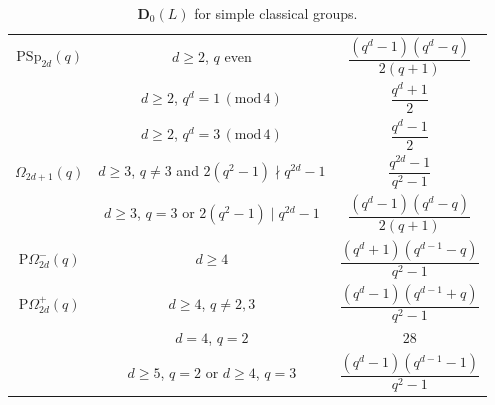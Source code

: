\documentclass{daj}
\theoremstyle{definition}
\theoremstyle{remark}
\newcommand{\D}{\mathbf{D}}
\begin{document}
{\begin{table}[ht]
\begin{tabular}{| c c | c |}
		\phantom{$\dfrac{1^1}{1_{1_1}}$}\hspace{-6mm}
		$\mathrm{PSp}_{2d}(q)$ & $d\geq 2$, $q$ even & $\dfrac{(q^d-1)(q^d-q)}{2(q+1)}$ \\
		
		\phantom{$\dfrac{1^1}{1_{1_1}}$}\hspace{-6mm}
		& $d\geq 2$, $q^d= 1\, (\mathrm{mod}\,4) $ & $\dfrac{q^d+1}{2}$ \\
		
		\phantom{$\dfrac{1^1}{1_{1_1}}$}\hspace{-6mm}
		& $d\geq 2$, $q^d= 3\, (\mathrm{mod}\,4) $ & $\dfrac{q^d-1}{2}$ \\
		
		\phantom{$\dfrac{1^1}{1_{1_1}}$}\hspace{-6mm}
		$\Omega_{2d+1}(q)$& $d\geq 3$, $q\ne 3$ and $2(q^2-1) \nmid q^{2d}-1$ & $\dfrac{q^{2d}-1}{q^2-1}$ \\
		
		\phantom{$\dfrac{1^1}{1_{1_1}}$}\hspace{-6mm}
		& $d\geq 3$, $q= 3$ or $2(q^2-1) \mid q^{2d}-1$ & $\dfrac{(q^{d}-1)(q^d-q)}{2(q+1)}$ \\
		
		\phantom{$\dfrac{1^1}{1_{1_1}}$}\hspace{-6mm}
		$\mathrm{P}\Omega^{-}_{2d}(q)$& $d\geq 4$ & $\dfrac{(q^d+1)(q^{d-1}-q)}{q^2-1}$ \\
		
		\phantom{$\dfrac{1^1}{1_{1_1}}$}\hspace{-6mm}
		$\mathrm{P}\Omega^{+}_{2d}(q)$& $d\geq 4$, $q\ne 2,3$ & $\dfrac{(q^d-1)(q^{d-1}+q)}{q^2-1}$ \\
		
		\phantom{$\dfrac{1^1}{1_{1_1}}$}\hspace{-6mm}
		& $d = 4$, $q= 2$ & $28$ \\
		
		\phantom{$\dfrac{1^1}{1_{1_1}}$}\hspace{-6mm}
		& $d \geq 5$, $q= 2$ or $d \geq 4$, $q= 3$  & $\dfrac{(q^d-1)(q^{d-1}-1)}{q^2-1}$  \\
		
		\hline
	\end{tabular}
	\medskip
	{\caption{$\D_0(L)$ for simple classical groups.}
		\label{table:ClassicOrdinary}}
\end{table}
}
\end{document}
